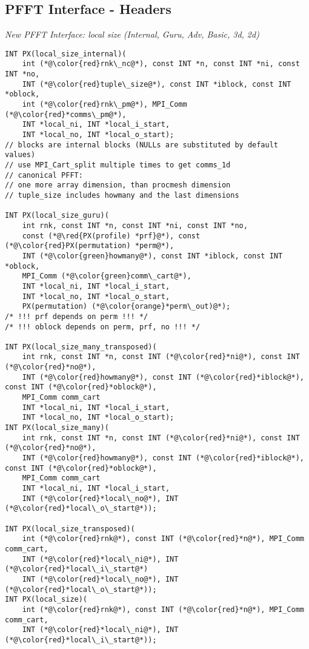 \subsection{PFFT Interface - Headers}
\emph{New PFFT Interface: local size (Internal, Guru, Adv, Basic, 3d, 2d)}
\begin{lstlisting}
INT PX(local_size_internal)(
    int (*@\color{red}rnk\_nc@*), const INT *n, const INT *ni, const INT *no,
    INT (*@\color{red}tuple\_size@*), const INT *iblock, const INT *oblock,
    int (*@\color{red}rnk\_pm@*), MPI_Comm (*@\color{red}*comms\_pm@*),
    INT *local_ni, INT *local_i_start,
    INT *local_no, INT *local_o_start);
// blocks are internal blocks (NULLs are substituted by default values)
// use MPI_Cart_split multiple times to get comms_1d
// canonical PFFT:
// one more array dimension, than procmesh dimension
// tuple_size includes howmany and the last dimensions

INT PX(local_size_guru)(
    int rnk, const INT *n, const INT *ni, const INT *no,
    const (*@\red{PX(profile) *prf}@*), const (*@\color{red}PX(permutation) *perm@*),
    INT (*@\color{green}howmany@*), const INT *iblock, const INT *oblock,
    MPI_Comm (*@\color{green}comm\_cart@*),
    INT *local_ni, INT *local_i_start,
    INT *local_no, INT *local_o_start,
    PX(permutation) (*@\color{orange}*perm\_out)@*);
/* !!! prf depends on perm !!! */
/* !!! oblock depends on perm, prf, no !!! */

INT PX(local_size_many_transposed)(
    int rnk, const INT *n, const INT (*@\color{red}*ni@*), const INT (*@\color{red}*no@*),
    INT (*@\color{red}howmany@*), const INT (*@\color{red}*iblock@*), const INT (*@\color{red}*oblock@*),
    MPI_Comm comm_cart
    INT *local_ni, INT *local_i_start,
    INT *local_no, INT *local_o_start);
INT PX(local_size_many)(
    int rnk, const INT *n, const INT (*@\color{red}*ni@*), const INT (*@\color{red}*no@*),
    INT (*@\color{red}howmany@*), const INT (*@\color{red}*iblock@*), const INT (*@\color{red}*oblock@*),
    MPI_Comm comm_cart
    INT *local_ni, INT *local_i_start,
    INT (*@\color{red}*local\_no@*), INT (*@\color{red}*local\_o\_start@*));

INT PX(local_size_transposed)(
    int (*@\color{red}rnk@*), const INT (*@\color{red}*n@*), MPI_Comm comm_cart,
    INT (*@\color{red}*local\_ni@*), INT (*@\color{red}*local\_i\_start@*)
    INT (*@\color{red}*local\_no@*), INT (*@\color{red}*local\_o\_start@*));
INT PX(local_size)(
    int (*@\color{red}rnk@*), const INT (*@\color{red}*n@*), MPI_Comm comm_cart,
    INT (*@\color{red}*local\_ni@*), INT (*@\color{red}*local\_i\_start@*));


\end{lstlisting}
